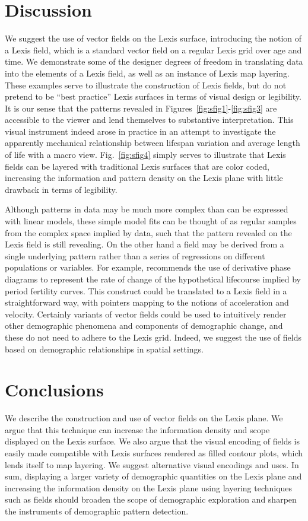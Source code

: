 \documentclass{article}
\begin{document}
\section{Discussion}
We suggest the use of vector fields on the Lexis surface, introducing the notion of a Lexis field, which is a standard vector field on a regular Lexis grid over age and time. We demonstrate some of the designer degrees of freedom in translating data into the elements of a Lexis field, as well as an instance of Lexis map layering. These examples serve to illustrate the construction of Lexis fields, but do not pretend to be ``best practice'' Lexis surfaces in terms of visual design or legibility. It is our sense that the patterns revealed in Figures~\ref{fig:sfig1}-\ref{fig:sfig3} are accessible to the viewer and lend themselves to substantive interpretation. This visual instrument indeed arose in practice in an attempt to investigate the apparently mechanical relationship between lifespan variation and average length of life with a macro view. Fig.~\ref{fig:sfig4} simply serves to illustrate that Lexis fields can be layered with traditional Lexis surfaces that are color coded, increasing the information and pattern density on the Lexis plane with little drawback in terms of legibility. 

Although patterns in data may be much more complex than can be expressed with linear models, these simple model fits can be thought of as regular samples from the complex space implied by data, such that the pattern revealed on the Lexis field is still revealing. On the other hand a field may be derived from a single underlying pattern rather than a series of regressions on different populations or variables. For example, \citet{shang2018visualizing} recommends the use of derivative phase diagrams to represent the rate of change of the hypothetical lifecourse implied by period fertility curves. This construct could be translated to a Lexis field in a straightforward way, with pointers mapping to the notions of acceleration and velocity. Certainly variants of vector fields could be used to intuitively render other demographic phenomena and components of demographic change, and these do not need to adhere to the Lexis grid. Indeed, we suggest the use of fields based on demographic relationships in spatial settings.

\section{Conclusions}
We describe the construction and use of vector fields on the Lexis plane. We argue that this technique can increase the information density and scope displayed on the Lexis surface. We also argue that the visual encoding of fields is easily made compatible with Lexis surfaces rendered as filled contour plots, which lends itself to map layering. We suggest alternative visual encodings and uses. In sum, displaying a larger variety of demographic quantities on the Lexis plane and increasing the information density on the Lexis plane using layering techniques such as fields should broaden the scope of demographic exploration and sharpen the instruments of demographic pattern detection.
\end{document}
